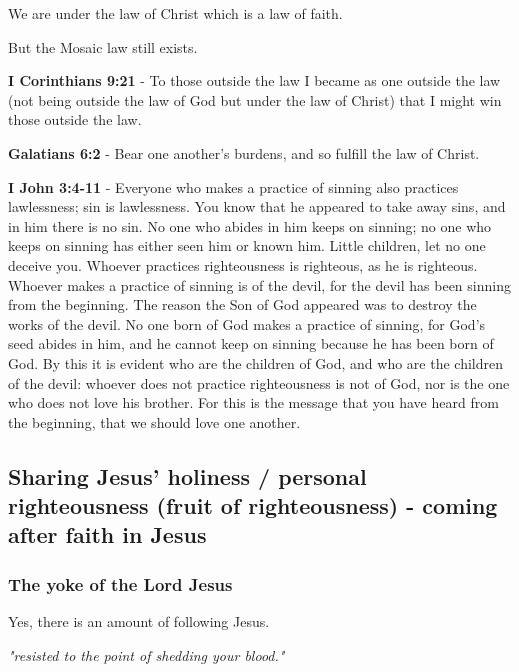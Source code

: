 \documentclass[11pt]{article}
\begin{document}
We are under the law of Christ which is a law of faith.

But the Mosaic law still exists.

\textbf{I Corinthians 9:21} - To those outside the law I became as one outside the law (not being outside the law of God but under the law of Christ) that I might win those outside the law.

\textbf{Galatians 6:2} - Bear one another's burdens, and so fulfill the law of Christ.

\textbf{I John 3:4-11} - Everyone who makes a practice of sinning also practices lawlessness; sin is lawlessness. You know that he appeared to take away sins, and in him there is no sin. No one who abides in him keeps on sinning; no one who keeps on sinning has either seen him or known him. Little children, let no one deceive you. Whoever practices righteousness is righteous, as he is righteous. Whoever makes a practice of sinning is of the devil, for the devil has been sinning from the beginning. The reason the Son of God appeared was to destroy the works of the devil. No one born of God makes a practice of sinning, for God's seed abides in him, and he cannot keep on sinning because he has been born of God. By this it is evident who are the children of God, and who are the children of the devil: whoever does not practice righteousness is not of God, nor is the one who does not love his brother. For this is the message that you have heard from the beginning, that we should love one another.

\subsection{Sharing Jesus' holiness / personal righteousness (fruit of righteousness) - coming \textbf{after} faith in Jesus}
\label{sec:orga57db77}
\subsubsection{The yoke of the Lord Jesus}
\label{sec:orge051297}
Yes, there is an amount of following Jesus.

\emph{"resisted to the point of shedding your blood."}
\end{document}
